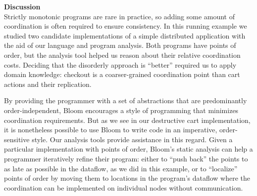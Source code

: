 
\noindent
\textbf{Discussion}\\
\noindent
Strictly monotonic programs
are rare in practice, so adding some amount of coordination is often required to
ensure consistency. In this running example we studied
two candidate implementations of a simple distributed application with the aid of
our language and program analysis. Both programs have points of order, but the analysis tool helped us reason about their relative coordination costs.  Deciding that the disorderly
approach is ``better'' required us to apply domain knowledge: checkout is a coarser-grained coordination point than cart actions and their replication.

By providing the programmer with a set of abstractions that are predominantly
order-independent, Bloom encourages a style of programming that minimizes
coordination requirements. But as we see in our destructive cart implementation,
it is nonetheless possible to use Bloom to write code in an imperative,
order-sensitive style. Our analysis tools provide assistance in this regard.  Given a
particular implementation with points of order, Bloom's static analysis can help
a programmer iteratively refine their program: either to ``push back'' the
points to as late as possible in the dataflow, as we did in this example, or to
``localize'' points of order by moving them to locations in the program's dataflow
where the coordination can be implemented on individual nodes without
communication.
